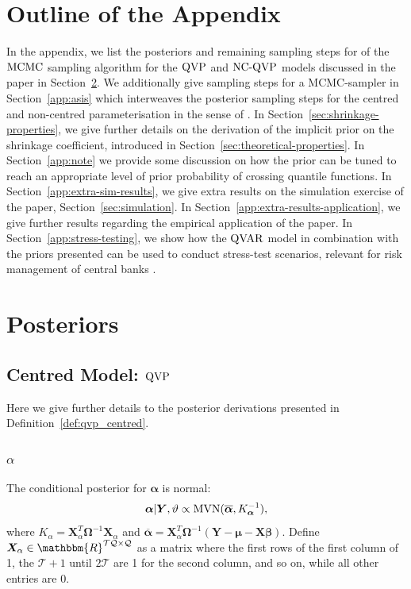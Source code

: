 \section{Outline of the Appendix}
%
In the appendix, we list the posteriors and remaining sampling steps for of the $\operatorname{MCMC}$ sampling algorithm for the $\operatorname{QVP}$ and $\operatorname{NC-QVP}$ models discussed in the paper in Section~\ref{app:qvp-posteriors}. We additionally give sampling steps for a MCMC-sampler in Section~\ref{app:asis} which interweaves the posterior sampling steps for the centred and non-centred parameterisation in the sense of \citet{bitto2019achieving}. In Section~\ref{sec:shrinkage-properties}, we give further details on the derivation of the implicit prior on the shrinkage coefficient, introduced in Section~\ref{sec:theoretical-properties}. In Section~\ref{app:note} we provide some discussion on how the prior can be tuned to reach an appropriate level of prior probability of crossing quantile functions. In Section~\ref{app:extra-sim-results}, we give extra results on the simulation exercise of the paper, Section~\ref{sec:simulation}. In Section~\ref{app:extra-results-application}, we give further results regarding the empirical application of the paper. In Section~\ref{app:stress-testing}, we show how the $\operatorname{QVAR}$ model in combination with the priors presented can be used to conduct stress-test scenarios, relevant for risk management of central banks \citep{chavleishvili2023measuring}.

\section{Posteriors}\label{app:qvp-posteriors}
%
\subsection{Centred Model: $\operatorname{QVP}$}
%
Here we give further details to the posterior derivations presented in Definition~\ref{def:qvp_centred}.
\subsubsection{$\alpha$}
%
The conditional posterior for $\boldsymbol{\alpha}$ is normal:
%
\begin{equation}
    \boldsymbol{\alpha}\vert \boldsymbol{Y},\vartheta \propto \mathrm{MVN}(\overline{\boldsymbol{\alpha}}, K^{-1}_{\boldsymbol{\alpha}}),
\end{equation}
%
where $K_{\alpha} = \boldsymbol{X}_{\alpha}^T\boldsymbol{\Omega}^{-1}\boldsymbol{X}_{\alpha}$ and $\overline{\boldsymbol{\alpha}} = \boldsymbol{X}_{\alpha}^T\boldsymbol{\Omega}^{-1}(\boldsymbol{Y} - \boldsymbol{\mu} - \boldsymbol{X}\boldsymbol{\beta})$. Define $\boldsymbol{X}_{\alpha} \in \mathbbm{R}^{\mathcal{T}\mathcal{Q} \times \mathcal{Q} }$ as a matrix where the first rows of the first column of 1, the $\mathcal{T}+1$ until  $2\mathcal{T}$ are 1 for the second column, and so on, while all other entries are 0.
%
